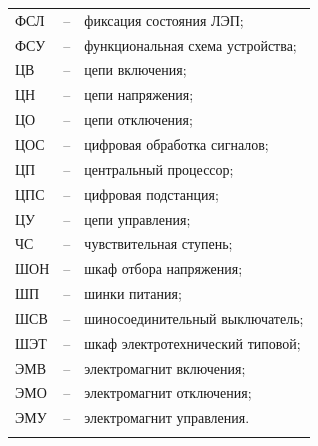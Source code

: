 \begin{longtable}{>{\raggedright\arraybackslash}m{2cm}>{\raggedright\arraybackslash}m{0.5cm}>{\raggedright\arraybackslash}m{20cm}}
ФСЛ & -- & фиксация состояния ЛЭП; \\
ФСУ & -- & функциональная схема устройства; \\
ЦВ & -- & цепи включения; \\
ЦН & -- & цепи напряжения; \\
ЦО & -- & цепи отключения; \\
ЦОС & -- & цифровая обработка сигналов; \\
ЦП & -- & центральный процессор; \\
ЦПС & -- & цифровая подстанция; \\
ЦУ & -- & цепи управления; \\
ЧС & -- & чувствительная ступень; \\
ШОН & -- & шкаф отбора напряжения; \\
ШП & -- & шинки питания; \\
ШСВ & -- & шиносоединительный выключатель; \\
ШЭТ & -- & шкаф электротехнический типовой; \\
ЭМВ & -- & электромагнит включения; \\
ЭМО & -- & электромагнит отключения; \\
ЭМУ & -- & электромагнит управления. \\
{\color{white}\fontsize{0.1pt}{0.1pt}\selectfont<endABBRS>}
\end{longtable}
